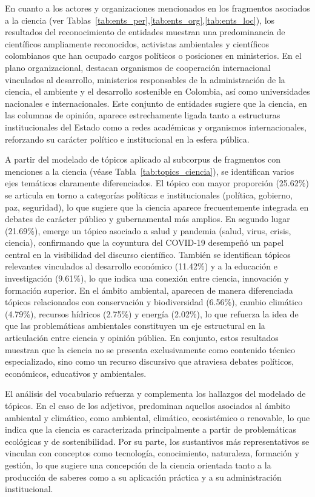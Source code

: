 \documentclass[11pt,a4paper]{article}
\begin{document}
En cuanto a los actores y organizaciones mencionados en los fragmentos asociados a la ciencia (ver Tablas~\ref{tab:ents_per},\ref{tab:ents_org},\ref{tab:ents_loc}), los resultados del reconocimiento de entidades muestran una predominancia de científicos ampliamente reconocidos, activistas ambientales y científicos colombianos que han ocupado cargos políticos o posiciones en ministerios. En el plano organizacional, destacan organismos de cooperación internacional vinculados al desarrollo, ministerios responsables de la administración de la ciencia, el ambiente y el desarrollo sostenible en Colombia, así como universidades nacionales e internacionales. Este conjunto de entidades sugiere que la ciencia, en las columnas de opinión, aparece estrechamente ligada tanto a estructuras institucionales del Estado como a redes académicas y organismos internacionales, reforzando su carácter político e institucional en la esfera pública.

A partir del modelado de tópicos aplicado al subcorpus de fragmentos con menciones a la ciencia (véase Tabla~\ref{tab:topics_ciencia}), se identifican varios ejes temáticos claramente diferenciados. El tópico con mayor proporción (25.62\%) se articula en torno a categorías políticas e institucionales (política, gobierno, paz, seguridad), lo que sugiere que la ciencia aparece frecuentemente integrada en debates de carácter público y gubernamental más amplios. En segundo lugar (21.69\%), emerge un tópico asociado a salud y pandemia (salud, virus, crisis, ciencia), confirmando que la coyuntura del COVID-19 desempeñó un papel central en la visibilidad del discurso científico. También se identifican tópicos relevantes vinculados al desarrollo económico (11.42\%) y a la educación e investigación (9.61\%), lo que indica una conexión entre ciencia, innovación y formación superior. En el ámbito ambiental, aparecen de manera diferenciada tópicos relacionados con conservación y biodiversidad (6.56\%), cambio climático (4.79\%), recursos hídricos (2.75\%) y energía (2.02\%), lo que refuerza la idea de que las problemáticas ambientales constituyen un eje estructural en la articulación entre ciencia y opinión pública. En conjunto, estos resultados muestran que la ciencia no se presenta exclusivamente como contenido técnico especializado, sino como un recurso discursivo que atraviesa debates políticos, económicos, educativos y ambientales.


El análisis del vocabulario refuerza y complementa los hallazgos del modelado de tópicos. En el caso de los adjetivos, predominan aquellos asociados al ámbito ambiental y climático, como ambiental, climático, ecosistémico o renovable, lo que indica que la ciencia es caracterizada principalmente a partir de problemáticas ecológicas y de sostenibilidad. Por su parte, los sustantivos más representativos se vinculan con conceptos como tecnología, conocimiento, naturaleza, formación y gestión, lo que sugiere una concepción de la ciencia orientada tanto a la producción de saberes como a su aplicación práctica y a su administración institucional.
\end{document}
